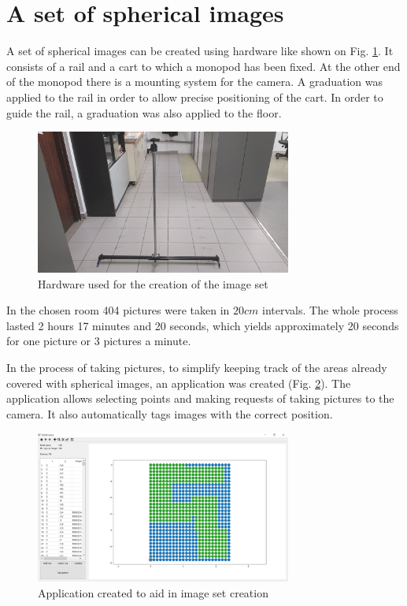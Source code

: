 \documentclass{svproc}
\begin{document}
\section{A set of spherical images}

A set of spherical images can be created using hardware like shown on Fig. \ref{fig:rig}.
It consists of a rail and a cart to which a monopod has been fixed.
At the other end of the monopod there is a mounting system for the camera.
A graduation was applied to the rail in order to allow precise positioning of the cart.
In order to guide the rail, a graduation was also applied to the floor.
\begin{figure}[!ht]
    \centering
    \includegraphics[width=0.75\textwidth]{img/rig/calosc.jpg}
    \caption{Hardware used for the creation of the image set}
    \label{fig:rig}
\end{figure}
In the chosen room 404 pictures were taken in $20 cm$ intervals.
The whole process lasted 2 hours 17 minutes and 20 seconds, which yields approximately 20 seconds for one picture or 3 pictures a minute.

In the process of taking pictures, to simplify keeping track of the areas already covered with spherical images, an application was created (Fig. \ref{fig:app}).
The application allows selecting points and making requests of taking pictures to the camera.
It also automatically tags images with the correct position.
\begin{figure}[!ht]
    \centering
    \includegraphics[width=0.75\textwidth]{img/creator.png}
    \caption{Application created to aid in image set creation}
    \label{fig:app}
\end{figure}
\end{document}
